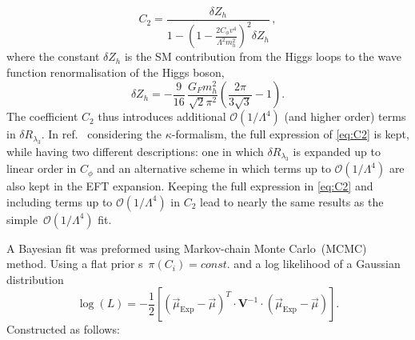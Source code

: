 	\begin{equation}
		C_2=\frac{\delta Z_h}{1-\left(1-\frac{2 C_\phi v^4}{\Lambda^2 m_h^2}\right)^2 \delta Z_h}\,, \label{eq:C2}
	\end{equation}
	where the constant $\delta Z_h$ is the SM contribution from the Higgs loops to the wave function renormalisation of the Higgs boson,
	\begin{equation}
		\delta Z_h =-\frac{9}{16}\,\frac{G_F m_h^2}{\sqrt{2}\pi^2}\left(\frac{2\pi}{3\sqrt{3}}-1\right).
	\end{equation}
	The coefficient $C_2$ thus introduces additional $\mathcal{O}(1/\Lambda^4)$ (and higher order) terms in $\delta R_{\lambda_3}$.  
	In ref.~\cite{Degrassi:2016wml} considering the $\kappa$-formalism, the full expression of \eqref{eq:C2} is kept, while having two different descriptions: one in which $\delta R_{\lambda_3}$ is expanded up to linear order in $C_\phi$ and an alternative scheme in which terms up to $\mathcal{O}(1/\Lambda^4)$ are also kept in the EFT expansion. Keeping the full expression in \eqref{eq:C2} and including terms up to $\mathcal{O}(1/\Lambda^4)$  in $C_2$ lead to nearly the same results as the simple~$\mathcal{O}(1/\Lambda^4)$ fit.
	
	A Bayesian fit was preformed using Markov-chain Monte Carlo~(MCMC) method.   Using a flat prior s~$ \pi(C_i)= const.$ and a log likelihood of a Gaussian distribution 
	\begin{equation}
		\log(L) = -\frac{1}{2}\left[  (\vec{\mu}_{\mathrm{Exp}} -\vec{\mu} ) ^{T} \cdot \mathbf{V}^{-1} \cdot ( \vec{\mu}_{\mathrm{Exp}} -\vec{\mu} )\right]  .
		\label{eq:loglike}
	\end{equation}
	Constructed as follows:
